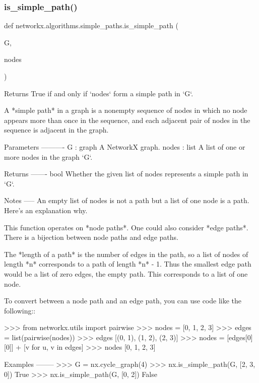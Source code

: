 \subsubsection{\texorpdfstring{is\+\_\+simple\+\_\+path()}{is\_simple\_path()}}
{\footnotesize\ttfamily def networkx.\+algorithms.\+simple\+\_\+paths.\+is\+\_\+simple\+\_\+path (\begin{DoxyParamCaption}\item[{}]{G,  }\item[{}]{nodes }\end{DoxyParamCaption})}

\begin{DoxyVerb}Returns True if and only if `nodes` form a simple path in `G`.

A *simple path* in a graph is a nonempty sequence of nodes in which
no node appears more than once in the sequence, and each adjacent
pair of nodes in the sequence is adjacent in the graph.

Parameters
----------
G : graph
    A NetworkX graph.
nodes : list
    A list of one or more nodes in the graph `G`.

Returns
-------
bool
    Whether the given list of nodes represents a simple path in `G`.

Notes
-----
An empty list of nodes is not a path but a list of one node is a
path. Here's an explanation why.

This function operates on *node paths*. One could also consider
*edge paths*. There is a bijection between node paths and edge
paths.

The *length of a path* is the number of edges in the path, so a list
of nodes of length *n* corresponds to a path of length *n* - 1.
Thus the smallest edge path would be a list of zero edges, the empty
path. This corresponds to a list of one node.

To convert between a node path and an edge path, you can use code
like the following::

    >>> from networkx.utils import pairwise
    >>> nodes = [0, 1, 2, 3]
    >>> edges = list(pairwise(nodes))
    >>> edges
    [(0, 1), (1, 2), (2, 3)]
    >>> nodes = [edges[0][0]] + [v for u, v in edges]
    >>> nodes
    [0, 1, 2, 3]

Examples
--------
>>> G = nx.cycle_graph(4)
>>> nx.is_simple_path(G, [2, 3, 0])
True
>>> nx.is_simple_path(G, [0, 2])
False\end{DoxyVerb}
 \mbox{\label{namespacenetworkx_1_1algorithms_1_1simple__paths_ac0efdc3cd497758f3090898c351d9221}} 
